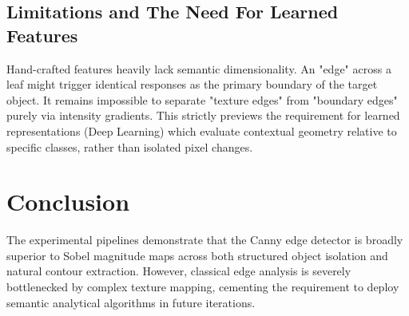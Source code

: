 \documentclass[11pt]{article}
\begin{document}
\subsection{Limitations and The Need For Learned Features}
Hand-crafted features heavily lack semantic dimensionality. An "edge" across a leaf might trigger identical responses as the primary boundary of the target object. It remains impossible to separate "texture edges" from "boundary edges" purely via intensity gradients. This strictly previews the requirement for learned representations (Deep Learning) which evaluate contextual geometry relative to specific classes, rather than isolated pixel changes.

\section{Conclusion}
The experimental pipelines demonstrate that the Canny edge detector is broadly superior to Sobel magnitude maps across both structured object isolation and natural contour extraction. However, classical edge analysis is severely bottlenecked by complex texture mapping, cementing the requirement to deploy semantic analytical algorithms in future iterations.
\end{document}
